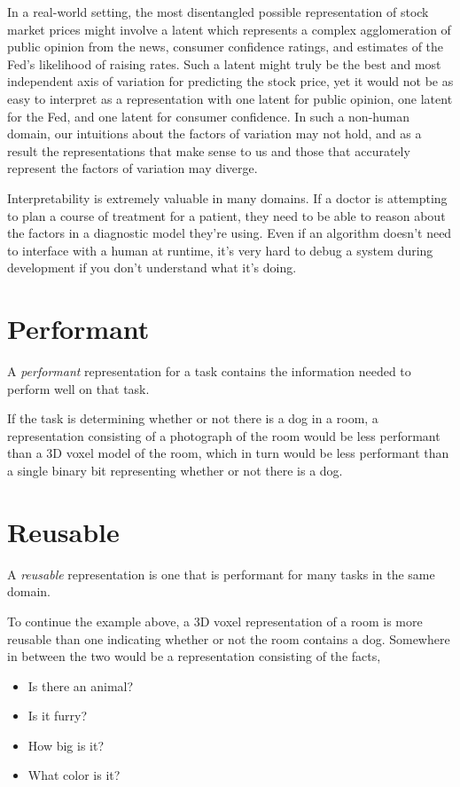 \documentclass[12pt,twoside]{mitthesis}
\providecommand{\tightlist}{%
  \setlength{\itemsep}{0pt}\setlength{\parskip}{0pt}}
\begin{document}
In a real-world setting, the most disentangled possible representation
of stock market prices might involve a latent which represents a complex
agglomeration of public opinion from the news, consumer confidence
ratings, and estimates of the Fed's likelihood of raising rates. Such a
latent might truly be the best and most independent axis of variation
for predicting the stock price, yet it would not be as easy to interpret
as a representation with one latent for public opinion, one latent for
the Fed, and one latent for consumer confidence. In such a non-human
domain, our intuitions about the factors of variation may not hold, and
as a result the representations that make sense to us and those that
accurately represent the factors of variation may diverge.

Interpretability is extremely valuable in many domains. If a doctor is
attempting to plan a course of treatment for a patient, they need to be
able to reason about the factors in a diagnostic model they're using.
Even if an algorithm doesn't need to interface with a human at runtime,
it's very hard to debug a system during development if you don't
understand what it's doing.

\section{Performant}\label{performant}

A \emph{performant} representation for a task contains the information
needed to perform well on that task.

If the task is determining whether or not there is a dog in a room, a
representation consisting of a photograph of the room would be less
performant than a 3D voxel model of the room, which in turn would be
less performant than a single binary bit representing whether or not
there is a dog.

\section{Reusable}\label{reusable}

A \emph{reusable} representation is one that is performant for many
tasks in the same domain.

To continue the example above, a 3D voxel representation of a room is
more reusable than one indicating whether or not the room contains a
dog. Somewhere in between the two would be a representation consisting
of the facts,

\begin{itemize}
\tightlist
\item
  Is there an animal?
\item
  Is it furry?
\item
  How big is it?
\item
  What color is it?
\end{itemize}
\end{document}
